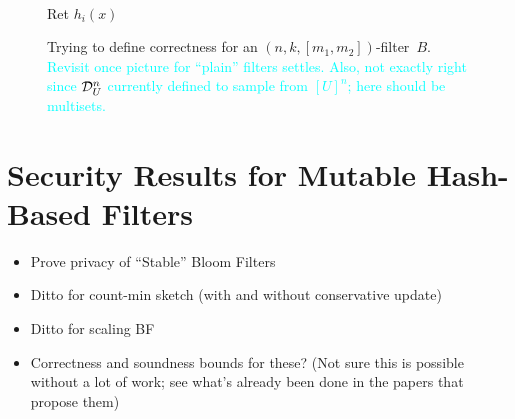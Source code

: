 \begin{figure}
{{\medskip
{}\\
Ret $h_i(x)$\\
}
}
\caption{Trying to define correctness for an $(n,k,[m_1,m_2])$-filter~$B$.  \textcolor{cyan}{Revisit once picture for ``plain'' filters settles.  Also, not exactly right since $\mathcal{D}_{U}^{n}$ currently defined to sample from $[U]^n$; here should be multisets.}}
\label{fig:correctness-mutable}
\end{figure}


 


 


\section{Security Results for Mutable Hash-Based Filters}
\begin{itemize}
\item Prove privacy of ``Stable'' Bloom Filters
\item Ditto for count-min sketch (with and without conservative update)
\item Ditto for scaling BF 
\item Correctness and soundness bounds for these?  (Not sure this is possible without a lot of work; see what's already been done in the papers that propose them)
\end{itemize}

